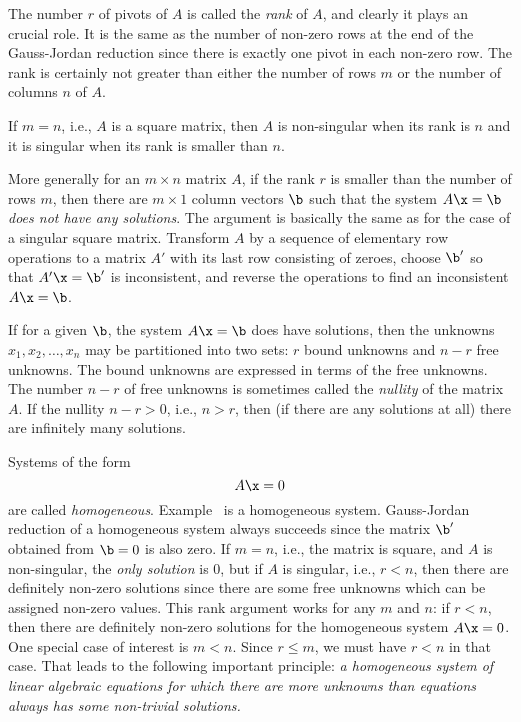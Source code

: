   The number $r$ of pivots of $A$
is called the {\it rank\/} of $A$, and clearly it plays
%
%
an crucial role.  It is the same as the number of non-zero rows
at the end of the Gauss-Jordan reduction since there is exactly
one pivot in each non-zero row.  The rank is certainly not greater than 
either the number of rows $m$ or the number of columns $n$ of $A$.

If $m = n$, i.e., $A$ is a square matrix, then $A$ is
non-singular when its rank is $n$ and it is singular when its
rank is smaller than $n$. 

  More generally for an $m\times n$ matrix $A$, if the  rank $r$ is smaller
than the number of rows $m$, then there are $m\times 1$
column vectors $\b$ such that the system $A\x = \b$  {\it does not
have any solutions}.  The argument is basically the same
as for the case of a singular square matrix.  Transform $A$ by
a sequence of elementary row operations to a matrix $A'$
with its last row consisting of zeroes, choose $\b'$ so that
$A'\x = \b'$ is inconsistent, and reverse the operations to
find an inconsistent $A\x = \b$.
 
If for a given $\b$, the system $A\x = \b$
does have solutions, then the unknowns
$x_1, x_2, \dots, x_n$ may be partitioned into two sets:
$r$ bound unknowns and  $n - r$
free unknowns.  The bound unknowns are
expressed in terms of the free unknowns.  The number $n - r$
of free unknowns is sometimes called the {\it nullity\/} of
the matrix $A$.  If the nullity $n - r > 0$, i.e., $n > r$,
then (if there are any solutions at all) there are infinitely
many solutions.
    
Systems of the form
$$
A\x = 0
$$
are called {\it homogeneous}.  Example \HomEx\ is a homogeneous
%
%
system.    Gauss-Jordan reduction of a homogeneous system always
succeeds since the matrix $\b'$ obtained from $\b = 0$ is
also zero.  If $m = n$, i.e., the matrix is square, and $A$
is non-singular, the {\it only solution} is 0, but if $A$
is singular, i.e., $r < n$, then there are definitely non-zero
solutions since there are some free unknowns which can be assigned
non-zero values.   This rank argument works for any $m$ and $n$:
if $r < n$, then there are definitely non-zero solutions for
the homogeneous system  $A\x = 0$.  One special case of interest
is $m < n$.  Since $r \le m$, we must have $r < n$ in that case.
That leads to the following important principle:  {\it a
homogeneous system of linear algebraic equations for which there
are more unknowns than equations always has some non-trivial
solutions.} 

